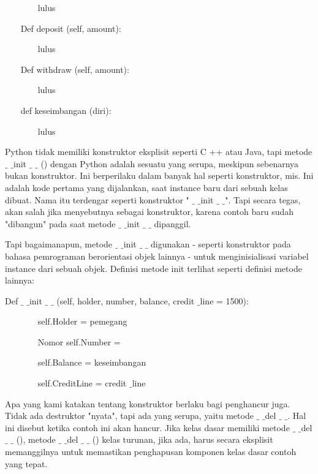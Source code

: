 ~~~~~~~ lulus \par
  \par
~~~ Def deposit (self, amount): \par
~~~~~~~ lulus \par
  \par
~~~ Def withdraw (self, amount): \par
~~~~~~~ lulus \par
  \par
~~~ def keseimbangan (diri): \par
~~~~~~~ lulus \par
\vspace{12pt}
Python tidak memiliki konstruktor eksplisit seperti C ++ atau Java, tapi metode  $  \_  $ $  \_  $init  $  \_  $ $  \_  $ () dengan Python adalah sesuatu yang serupa, meskipun sebenarnya bukan konstruktor. Ini berperilaku dalam banyak hal seperti konstruktor, mis. Ini adalah kode pertama yang dijalankan, saat instance baru dari sebuah kelas dibuat. Nama itu terdengar seperti konstruktor " $  \_  $ $  \_  $init $  \_  $ $  \_  $". Tapi secara tegas, akan salah jika menyebutnya sebagai konstruktor, karena contoh baru sudah "dibangun" pada saat metode  $  \_  $ $  \_  $init $  \_  $ $  \_  $ dipanggil. \par
Tapi bagaimanapun, metode  $  \_  $ $  \_  $init $  \_  $ $  \_  $ digunakan - seperti konstruktor pada bahasa pemrograman berorientasi objek lainnya - untuk menginisialisasi variabel instance dari sebuah objek. Definisi metode init terlihat seperti definisi metode lainnya: \par
\vspace{12pt}
Def  $  \_  $ $  \_  $init  $  \_  $ $  \_  $ (self, holder, number, balance, credit $  \_  $line = 1500): \par
~~~~~~~ self.Holder = pemegang \par
~~~~~~~ Nomor self.Number = \par
~~~~~~~ self.Balance = keseimbangan \par
~~~~~~~ self.CreditLine = credit $  \_  $line \par
\vspace{12pt}
Apa yang kami katakan tentang konstruktor berlaku bagi penghancur juga. Tidak ada destruktor "nyata", tapi ada yang serupa, yaitu metode  $  \_  $ $  \_  $del $  \_  $ $  \_  $. Hal ini disebut ketika contoh ini akan hancur. Jika kelas dasar memiliki metode  $  \_  $ $  \_  $del  $  \_  $ $  \_  $ (), metode  $  \_  $ $  \_  $del  $  \_  $ $  \_  $ () kelas turunan, jika ada, harus secara eksplisit memanggilnya untuk memastikan penghapusan komponen kelas dasar contoh yang tepat. \par
